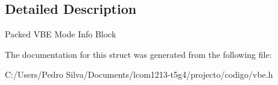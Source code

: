 \subsection{Detailed Description}
Packed V\-B\-E Mode Info Block 

The documentation for this struct was generated from the following file\-:\begin{DoxyCompactItemize}
\item 
C\-:/\-Users/\-Pedro Silva/\-Documents/lcom1213-\/t5g4/projecto/codigo/vbe.\-h\end{DoxyCompactItemize}
